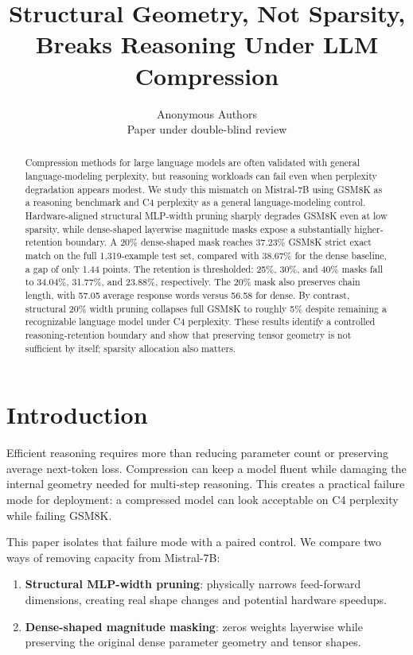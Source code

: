 \documentclass{article}
\title{Structural Geometry, Not Sparsity, Breaks Reasoning Under LLM Compression}
\author{Anonymous Authors \\
Paper under double-blind review
}
\begin{document}
\maketitle

\begin{abstract}
Compression methods for large language models are often validated with general language-modeling perplexity, but reasoning workloads can fail even when perplexity degradation appears modest. We study this mismatch on Mistral-7B using GSM8K as a reasoning benchmark and C4 perplexity as a general language-modeling control. Hardware-aligned structural MLP-width pruning sharply degrades GSM8K even at low sparsity, while dense-shaped layerwise magnitude masks expose a substantially higher-retention boundary. A 20\% dense-shaped mask reaches 37.23\% GSM8K strict exact match on the full 1,319-example test set, compared with 38.67\% for the dense baseline, a gap of only 1.44 points. The retention is thresholded: 25\%, 30\%, and 40\% masks fall to 34.04\%, 31.77\%, and 23.88\%, respectively. The 20\% mask also preserves chain length, with 57.05 average response words versus 56.58 for dense. By contrast, structural 20\% width pruning collapses full GSM8K to roughly 5\% despite remaining a recognizable language model under C4 perplexity. These results identify a controlled reasoning-retention boundary and show that preserving tensor geometry is not sufficient by itself; sparsity allocation also matters.
\end{abstract}

\section{Introduction}

Efficient reasoning requires more than reducing parameter count or preserving average next-token loss. Compression can keep a model fluent while damaging the internal geometry needed for multi-step reasoning. This creates a practical failure mode for deployment: a compressed model can look acceptable on C4 perplexity while failing GSM8K.

This paper isolates that failure mode with a paired control. We compare two ways of removing capacity from Mistral-7B:
\begin{enumerate}
    \item \textbf{Structural MLP-width pruning}: physically narrows feed-forward dimensions, creating real shape changes and potential hardware speedups.
    \item \textbf{Dense-shaped magnitude masking}: zeros weights layerwise while preserving the original dense parameter geometry and tensor shapes.
\end{enumerate}
\end{document}
